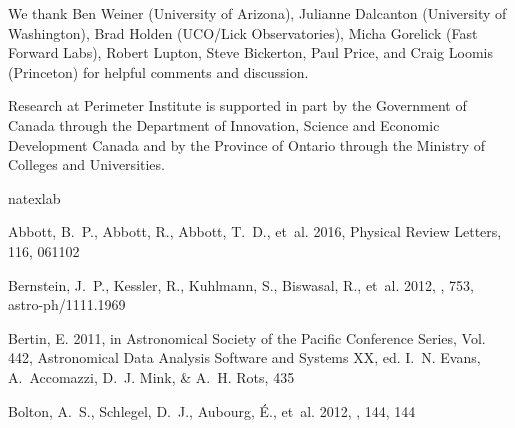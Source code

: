 \documentclass[11pt,letterpaper,linenumbers]{aastex63}
\begin{document}
\acknowledgments

We thank
Ben Weiner (University of Arizona),
Julianne Dalcanton (University of Washington),
Brad Holden (UCO/Lick Observatories),
Micha Gorelick (Fast Forward Labs),
Robert Lupton, Steve Bickerton, Paul Price, and Craig Loomis (Princeton)
for helpful comments and discussion.

Research at Perimeter Institute is supported in part by the Government
of Canada through the Department of Innovation, Science and Economic
Development Canada and by the Province of Ontario through the Ministry
of Colleges and Universities.

%
%
%

\begin{thebibliography}{}
\expandafter\ifx\csname natexlab\endcsname\relax\def\natexlab#1{#1}\fi

{Abbott}, B.~P., {Abbott}, R., {Abbott}, T.~D., {et~al.} 2016, Physical Review
  Letters, 116, 061102

Bernstein, J.~P., Kessler, R., Kuhlmann, S., Biswasal, R., {et~al.} 2012, \apj,
  753, astro-ph/1111.1969

{Bertin}, E. 2011, in Astronomical Society of the Pacific Conference Series,
  Vol. 442, Astronomical Data Analysis Software and Systems XX, ed. I.~N.
  {Evans}, A.~{Accomazzi}, D.~J. {Mink}, \& A.~H. {Rots}, 435

{Bolton}, A.~S., {Schlegel}, D.~J., {Aubourg}, {\'E}., {et~al.} 2012, \aj, 144,
  144


\end{thebibliography}
\end{document}

